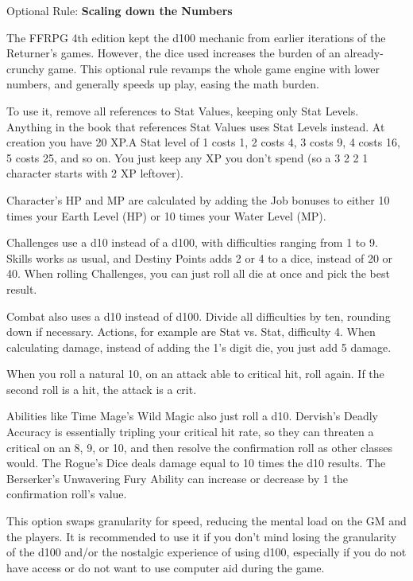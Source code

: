 \begin{multiboco}
Optional Rule: \textbf{Scaling down the Numbers}\label{optrule:scaling}

The FFRPG 4th edition kept the d100 mechanic from earlier iterations of the Returner’s games. However, the dice used increases the burden of an already-crunchy game. This optional rule revamps the whole game engine with lower numbers, and generally speeds up play, easing the math burden.

To use it, remove all references to Stat Values, keeping only Stat Levels. Anything in the book that references Stat Values uses Stat Levels instead. At creation you have 20 XP.\@{}A Stat level of 1 costs 1, 2 costs 4, 3 costs 9, 4 costs 16, 5 costs 25, and so on. You just keep any XP you don't spend (so a 3 2 2 1 character starts with 2 XP leftover).

Character’s HP and MP are calculated by adding the Job bonuses to either 10 times your Earth Level (HP) or 10 times your Water Level (MP).

Challenges use a d10 instead of a d100, with difficulties ranging from 1 to 9. Skills works as usual, and Destiny Points adds 2 or 4 to a dice, instead of 20 or 40. When rolling Challenges, you can just roll all die at once and pick the best result.

Combat also uses a d10 instead of d100. Divide all difficulties by ten, rounding down if necessary.  Actions, for example are Stat vs. Stat, difficulty 4. When calculating damage, instead of adding the 1's digit die, you just add 5 damage.

When you roll a natural 10, on an attack able to critical hit, roll again. If the second roll is a hit, the attack is a crit.

Abilities like Time Mage’s Wild Magic also just roll a d10. Dervish's Deadly Accuracy is essentially tripling your critical hit rate, so they can threaten a critical on an 8, 9, or 10, and then resolve the confirmation roll as other classes would. The Rogue’s Dice deals damage equal to 10 times the d10 results. The Berserker’s Unwavering Fury Ability can increase or decrease by 1 the confirmation roll’s value.

This option swaps granularity for speed, reducing the mental load on the GM and the players. It is recommended to use it if you don’t mind losing the granularity of the d100 and/or the nostalgic experience of using d100, especially if you do not have access or do not want to use computer aid during the game.
\end{multiboco}